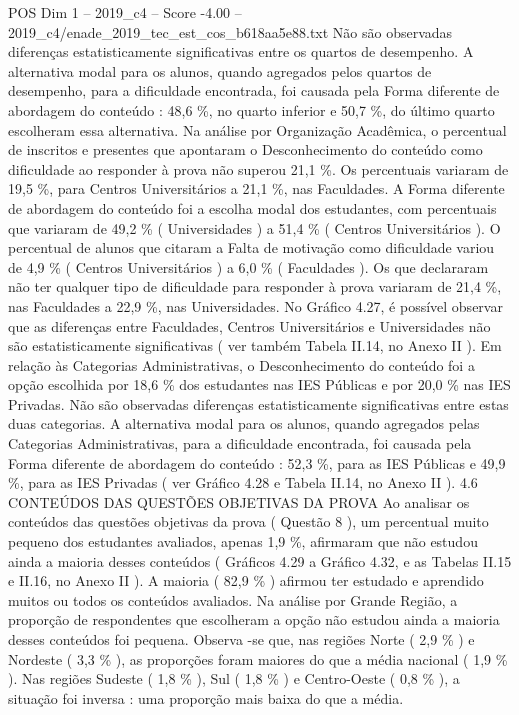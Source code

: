 \begin{textsample}{POS Dim 1 – 2019\_c4 – Score -4.00 – 2019\_c4/enade\_2019\_tec\_est\_cos\_b618aa5e88.txt}
Não são observadas diferenças estatisticamente significativas entre os quartos de desempenho.
A alternativa modal para os alunos, quando agregados pelos quartos de desempenho, para a dificuldade encontrada, foi causada pela Forma diferente de abordagem do conteúdo : 48,6 \%, no quarto inferior e 50,7 \%, do último quarto escolheram essa alternativa.
Na análise por Organização Acadêmica, o percentual de inscritos e presentes que apontaram o Desconhecimento do conteúdo como dificuldade ao responder à prova não superou 21,1 \%.
Os percentuais variaram de 19,5 \%, para Centros Universitários a 21,1 \%, nas Faculdades.
A Forma diferente de abordagem do conteúdo foi a escolha modal dos estudantes, com percentuais que variaram de 49,2 \% ( Universidades ) a 51,4 \% ( Centros Universitários ).
O percentual de alunos que citaram a Falta de motivação como dificuldade variou de 4,9 \% ( Centros Universitários ) a 6,0 \% ( Faculdades ).
Os que declararam não ter qualquer tipo de dificuldade para responder à prova variaram de 21,4 \%, nas Faculdades a 22,9 \%, nas Universidades.
No Gráfico 4.27, é possível observar que as diferenças entre Faculdades, Centros Universitários e Universidades não são estatisticamente significativas ( ver também Tabela II.14, no Anexo II ).
Em relação às Categorias Administrativas, o Desconhecimento do conteúdo foi a opção escolhida por 18,6 \% dos estudantes nas IES Públicas e por 20,0 \% nas IES Privadas.
Não são observadas diferenças estatisticamente significativas entre estas duas categorias.
A alternativa modal para os alunos, quando agregados pelas Categorias Administrativas, para a dificuldade encontrada, foi causada pela Forma diferente de abordagem do conteúdo : 52,3 \%, para as IES Públicas e 49,9 \%, para as IES Privadas ( ver Gráfico 4.28 e Tabela II.14, no Anexo II ). 4.6 CONTEÚDOS DAS QUESTÕES OBJETIVAS DA PROVA Ao analisar os conteúdos das questões objetivas da prova ( Questão 8 ), um percentual muito pequeno dos estudantes avaliados, apenas 1,9 \%, afirmaram que não estudou ainda a maioria desses conteúdos ( Gráficos 4.29 a Gráfico 4.32, e as Tabelas II.15 e II.16, no Anexo II ).
A maioria ( 82,9 \% ) afirmou ter estudado e aprendido muitos ou todos os conteúdos avaliados.
Na análise por Grande Região, a proporção de respondentes que escolheram a opção não estudou ainda a maioria desses conteúdos foi pequena.
Observa -se que, nas regiões Norte ( 2,9 \% ) e Nordeste ( 3,3 \% ), as proporções foram maiores do que a média nacional ( 1,9 \% ).
Nas regiões Sudeste ( 1,8 \% ), Sul ( 1,8 \% ) e Centro-Oeste ( 0,8 \% ), a situação foi inversa : uma proporção mais baixa do que a média.

\end{textsample}
